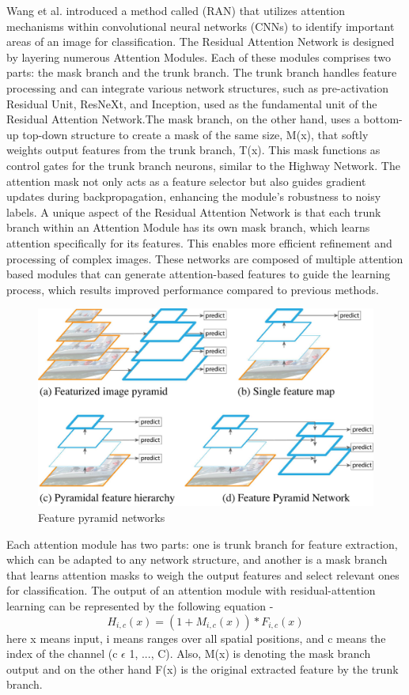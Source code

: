 Wang et al. \cite{wang2017residual} introduced a method called (RAN) that utilizes attention mechanisms within convolutional neural networks (CNNs) to identify important areas of an image for classification. The Residual Attention Network is designed by layering numerous Attention Modules. Each of these modules comprises two parts: the mask branch and the trunk branch. The trunk branch handles feature processing and can integrate various network structures, such as pre-activation Residual Unit, ResNeXt, and Inception, used as the fundamental unit of the Residual Attention Network.The mask branch, on the other hand, uses a bottom-up top-down structure to create a mask of the same size, M(x), that softly weights output features from the trunk branch, T(x). This mask functions as control gates for the trunk branch neurons, similar to the Highway Network. The attention mask not only acts as a feature selector but also guides gradient updates during backpropagation, enhancing the module's robustness to noisy labels. A unique aspect of the Residual Attention Network is that each trunk branch within an Attention Module has its own mask branch, which learns attention specifically for its features. This enables more efficient refinement and processing of complex images. These networks are composed of multiple attention based modules that can generate attention-based features to guide the learning process, which results improved performance compared to previous methods.
\begin{figure}[!htbp]
    \centering
    \includegraphics[scale=.15]{figures/fpn.jpg}
    \caption{Feature pyramid networks \cite{ung2021efficient}}
    \label{fig:fpn}
\end{figure}
Each attention module has two parts: one is  trunk branch for feature extraction, which can be adapted to any network structure, and another is a mask branch that learns attention masks to weigh the output features and select relevant ones for classification. The output of an attention module with residual-attention learning can be represented by the following equation -
\begin{equation}
    H_{i,c}(x) = (1+M_{i,c}(x))*F_{i,c}(x)
\end{equation}
here x means input, i means ranges over all spatial positions, and c means the index of the channel (c \(\epsilon\) 1, ..., C). Also, M(x) is denoting the mask branch output and on the other hand F(x) is the original extracted feature by the trunk branch.

